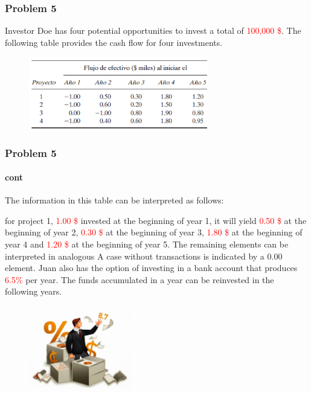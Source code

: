 \documentclass[10pt,svgnames,fragile]{beamer}
\begin{document}
\begin{frame}
\frametitle{Problem 5}

Investor Doe has four potential opportunities to invest a total of \textcolor{red}{100,000 \$}. The following table provides the cash flow for four investments.

\begin{figure}
\includegraphics[width=0.7\textwidth]{images/io1.PNG}
\end{figure}
\end{frame}

\begin{frame}
\frametitle{Problem 5}
\framesubtitle{cont}

The information in this table can be interpreted as follows:

for project 1, \textcolor{red}{1.00 \$} invested at the beginning of year 1, it will yield \textcolor{red}{0.50 \$} at the beginning of year 2, \textcolor{red}{0.30 \$} at the beginning of year 3, \textcolor{red}{1.80 \$} at the beginning of year 4 and \textcolor{red}{1.20 \$} at the beginning of year 5. The remaining elements can be interpreted in analogous
A case without transactions is indicated by a 0.00 element. Juan also has the option of investing in a bank account that produces \textcolor{red}{6.5\%} per year. The funds accumulated in a year can be reinvested in the following years.

\begin{figure}
\includegraphics[width=0.4\textwidth]{images/E.jpg}
\end{figure}

\end{frame}

\end{document}
